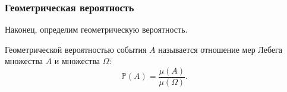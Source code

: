 \subsubsection{Геометрическая вероятность}
Наконец, определим геометрическую вероятность.

\begin{definition}
Геометрической вероятностью события $A$ называется отношение мер Лебега множества $A$ и множества $\Omega$:
\[
\mathbb{P}(A) = \frac{\mu(A)}{\mu(\Omega)}.
\]
\end{definition}